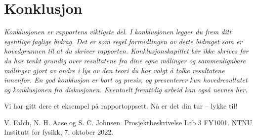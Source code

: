 \documentclass[5p]{elsarticle}
\begin{document}
\section{Konklusjon}
\textit{
Konklusjonen er rapportens viktigste del. I konklusjonen legger du frem ditt egentlige faglige bidrag. Det er som regel formidlingen av dette bidraget som er hovedgrunnen til at du skriver rapporten. Konklusjonskapitlet bør ikke skrives før du har tenkt grundig over resultatene fra dine egne målinger og sammenlignbare målinger gjort av andre i lys av den teori du har valgt å tolke resultatene innenfor. En god konklusjon er kort og presis, og presenterer kun hovedresultatet og konklusjonen fra diskusjonen. Eventuelt fremtidig arbeid kan også nevnes her. 
}

Vi har gitt dere et eksempel på rapportoppsett. Nå er det din tur -- lykke til!


\begin{thebibliography}{99}	%

V. Falch, N. H. Aase og S. C. Johnsen. Prosjektbeskrivelse Lab 3 FY1001. NTNU Institutt for fysikk, 7. oktober 2022.

\end{thebibliography}
\end{document}
